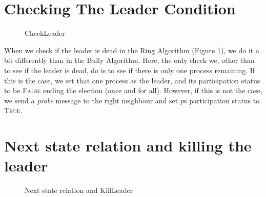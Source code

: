 \documentclass{report}
\begin{document}
\section{Checking The Leader Condition}
\begin{figure}
  \tlatex

\@x{}\moduleLeftDash{}\moduleRightDash\@xx{}%
%
%
%
%
%
%
%
%
\@xx{}%
\@x{}\bottombar\@xx{}%

  \caption{CheckLeader}
  \label{ringcheckleader}
  \end{figure}


When we check if the leader is dead in the Ring Algorithm (Figure \ref{ringcheckleader}), we do it a bit differently than in the Bully Algorithm. Here, the only check we, other than to see if the leader is dead, do is to see if there is only one process remaining. If this is the case, we set that one process as the leader, and its participation status to be \textsc{False} ending the election (once and for all). However, if this is not the case, we send a \textit{probe} message to the right neighbour and set $p$s participation status to \textsc{True}.

\section{Next state relation and killing the leader}

\begin{figure}
\tlatex
\@x{}\moduleLeftDash{}\moduleRightDash\@xx{}%
%
%
\@pvspace{8.0pt}%
%
\@x{}\bottombar\@xx{}%

\caption{Next state relation and KillLeader}
\label{ringnextleader}
\end{figure}
\end{document}
